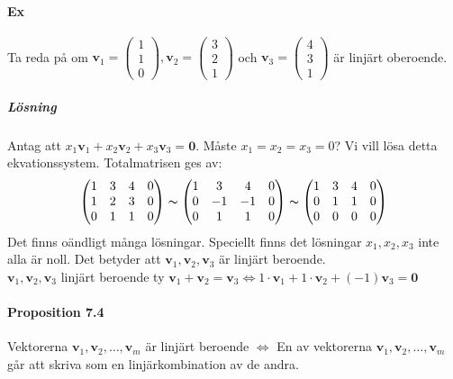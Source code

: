\paragraph{Ex} Ta reda på om $\bm{v}_{1}=\begin{pmatrix}1\\1\\0\end{pmatrix},\bm{v}_{2}=\begin{pmatrix}3\\2\\1\end{pmatrix}$ och $\bm{v}_{3}=\begin{pmatrix}4\\3\\1\end{pmatrix}$ är linjärt oberoende.
\subparagraph{Lösning} Antag att $x_{1}\bm{v}_{1}+x_{2}\bm{v}_{2}+x_{3}\bm{v}_{3}=\bm{0}$.
Måste $x_{1}=x_{2}=x_{3}=0$? 
Vi vill lösa detta ekvationssystem.
Totalmatrisen ges av:
\begin{equation*}
    \begin{pmatrix}
        1&3&4&0\\
        1&2&3&0\\
        0&1&1&0
    \end{pmatrix}
    \thicksim
    \begin{pmatrix}
        1&3&4&0\\
        0&-1&-1&0\\
        0&1&1&0
    \end{pmatrix}
    \thicksim
    \begin{pmatrix}
        1&3&4&0\\
        0&1&1&0\\
        0&0&0&0
    \end{pmatrix}
\end{equation*}
Det finns oändligt många lösningar.
Speciellt finns det lösningar $x_{1},x_{2},x_{3}$ inte alla är noll.
Det betyder att $\bm{v}_{1},\bm{v}_{2},\bm{v}_{3}$ är linjärt beroende.\\
$\bm{v}_{1},\bm{v}_{2},\bm{v}_{3}$ linjärt beroende ty $\bm{v}_{1}+\bm{v}_{2}=\bm{v}_{3} \Leftrightarrow 1\cdot\bm{v}_{1}+1\cdot\bm{v}_{2}+(-1)\bm{v}_{3}=\bm{0}$

\paragraph{Proposition 7.4} Vektorerna $\bm{v}_{1},\bm{v}_{2},\ldots,\bm{v}_{m}$ är linjärt beroende $\Leftrightarrow$ En av vektorerna $\bm{v}_{1},\bm{v}_{2},\ldots,\bm{v}_{m}$ går att skriva som en linjärkombination av de andra.

